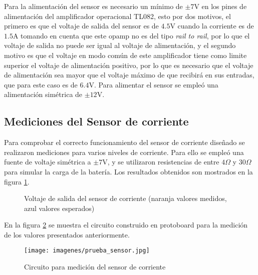     Para la alimentación del sensor es necesario un mínimo de $\pm7\text{V}$ en
    los pines de alimentación del amplificador operacional TL082, esto por dos 
    motivos, el primero es que el voltaje de salida del sensor es de $4.5\text{V}$
    cuando la corriente es de $1.5\text{A}$ tomando en cuenta que este opamp 
    no es del tipo \textit{rail to rail}, por lo que el voltaje de salida no
    puede ser igual al voltaje de alimentación, y el segundo motivo es que el
    voltaje en modo común de este amplificador tiene como limite superior el
    voltaje de alimentación positivo, por lo que es necesario que el voltaje 
    de alimentación sea mayor que el voltaje máximo de que recibirá en sus entradas,
    que para este caso es de $6.4\text{V}$. Para alimentar el sensor se empleó
    una alimentación simétrica de $\pm 12\text{V}$.
    
    \subsection{Mediciones del Sensor de corriente}

    Para comprobar el correcto funcionamiento del sensor de corriente diseñado
    se realizaron mediciones para varios niveles de corriente. Para ello se
    empleó una fuente de voltaje simétrica a $\pm7\text{V}$, y se utilizaron resistencias de entre 
    $4\Omega$ y $30\Omega$ para simular la carga de la batería. Los resultados 
    obtenidos son mostrados en la figura \ref{fig:mediciones_sensor_grap}. 

    \begin{figure}[H]
        \centering
{}
\label{fig:mediciones_sensor_grap}
\caption{Voltaje de salida del sensor de corriente (naranja valores medidos, azul valores esperados)}
\end{figure}
    En la figura \ref{fig:mediciones_sensor} se muestra el circuito construido
    en protoboard para la medición de los valores presentados anteriormente.

    \begin{figure}[H]
        \centering
        \texttt{[image: imagenes/prueba\_sensor.jpg]}
        \caption{Circuito para medición del sensor de corriente}
        \label{fig:mediciones_sensor}
    \end{figure}
